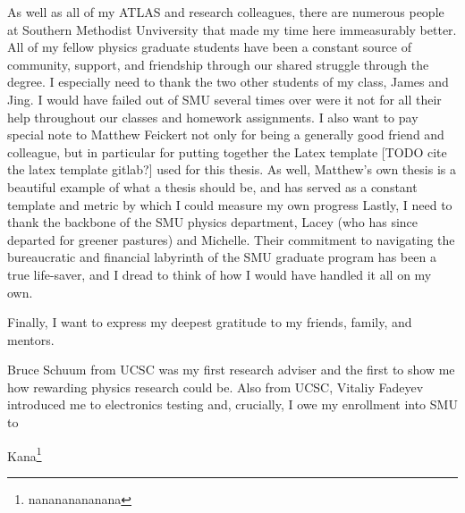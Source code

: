 As well as all of my ATLAS and research colleagues,
    there are numerous people at Southern Methodist Unviversity that made my time here immeasurably better.
All of my fellow physics graduate students have been a constant source of community, support, and friendship
    through our shared struggle through the degree.
I especially need to thank the two other students of my class, James and Jing.
I would have failed out of SMU several times over were it not
    for all their help throughout our classes and homework assignments.
I also want to pay special note to Matthew Feickert not only for being a generally good friend and colleague,
    but in particular for putting together the Latex template [TODO cite the latex template gitlab?]
    used for this thesis.
As well, Matthew's own thesis\cite{matthew_feickert} is a beautiful example of what a thesis should be,
    and has served as a constant template and metric by which I could measure my own progress\cite{
        Indeed, this very section is structured based on his example.
    }
Lastly, I need to thank the backbone of the SMU physics department, 
    Lacey (who has since departed for greener pastures) and Michelle.
Their commitment to navigating the bureaucratic and financial labyrinth of the SMU graduate program
    has been a true life-saver, and I dread to think of how I would have handled it all on my own.



Finally, I want to express my deepest gratitude to my friends, family, and mentors.

Bruce Schuum from UCSC was my first research adviser
    and the first to show me how rewarding physics research could be.
Also from UCSC, Vitaliy Fadeyev introduced me to electronics testing
    and, crucially, I owe my enrollment into SMU to 







Kana\footnote{nanananananana}
